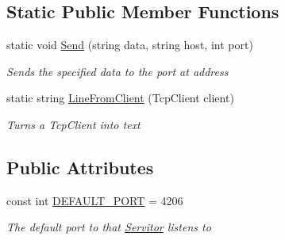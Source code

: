 \subsection*{Static Public Member Functions}
\begin{DoxyCompactItemize}
\item 
static void \hyperlink{classHumDrum_1_1Operations_1_1Servitor_a2e2fe524ce089bcd5f0f481ff3315c40}{Send} (string data, string host, int port)
\begin{DoxyCompactList}\small\item\em Sends the specified data to the port at address \end{DoxyCompactList}\item 
static string \hyperlink{classHumDrum_1_1Operations_1_1Servitor_aefa043103591c578afce5db32f389b43}{Line\+From\+Client} (Tcp\+Client client)
\begin{DoxyCompactList}\small\item\em Turns a Tcp\+Client into text \end{DoxyCompactList}\end{DoxyCompactItemize}
\subsection*{Public Attributes}
\begin{DoxyCompactItemize}
\item 
const int \hyperlink{classHumDrum_1_1Operations_1_1Servitor_a97c78f85fb9cc1c96c61ea771cc97201}{D\+E\+F\+A\+U\+L\+T\+\_\+\+P\+O\+RT} = 4206
\begin{DoxyCompactList}\small\item\em The default port to that \hyperlink{classHumDrum_1_1Operations_1_1Servitor}{Servitor} listens to \end{DoxyCompactList}\end{DoxyCompactItemize}
